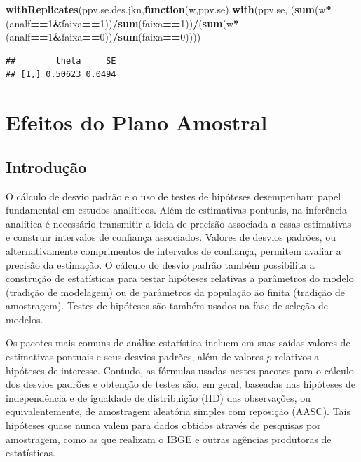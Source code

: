 \documentclass[]{book}
\newenvironment{Shaded}{\begin{snugshade}}{\end{snugshade}}
\newcommand{\KeywordTok}[1]{\textcolor[rgb]{0.13,0.29,0.53}{\textbf{#1}}}
\newcommand{\DecValTok}[1]{\textcolor[rgb]{0.00,0.00,0.81}{#1}}
\newcommand{\ControlFlowTok}[1]{\textcolor[rgb]{0.13,0.29,0.53}{\textbf{#1}}}
\newcommand{\OperatorTok}[1]{\textcolor[rgb]{0.81,0.36,0.00}{\textbf{#1}}}
\newcommand{\NormalTok}[1]{#1}
\theoremstyle{definition}
\theoremstyle{definition}
\theoremstyle{definition}
\theoremstyle{remark}
\begin{document}
\begin{Shaded}
\begin{Highlighting}[]
\KeywordTok{withReplicates}\NormalTok{(ppv.se.des.jkn,}\ControlFlowTok{function}\NormalTok{(w,ppv.se) }\KeywordTok{with}\NormalTok{(ppv.se,}
\NormalTok{(}\KeywordTok{sum}\NormalTok{(w}\OperatorTok{*}\NormalTok{(analf}\OperatorTok{==}\DecValTok{1}\OperatorTok{&}\NormalTok{faixa}\OperatorTok{==}\DecValTok{1}\NormalTok{))}\OperatorTok{/}\KeywordTok{sum}\NormalTok{(faixa}\OperatorTok{==}\DecValTok{1}\NormalTok{))}\OperatorTok{/}\NormalTok{(}\KeywordTok{sum}\NormalTok{(w}\OperatorTok{*}\NormalTok{(analf}\OperatorTok{==}\DecValTok{1}\OperatorTok{&}\NormalTok{faixa}\OperatorTok{==}\DecValTok{0}\NormalTok{))}\OperatorTok{/}\KeywordTok{sum}\NormalTok{(faixa}\OperatorTok{==}\DecValTok{0}\NormalTok{))))}
\end{Highlighting}
\end{Shaded}

\begin{verbatim}
##        theta     SE
## [1,] 0.50623 0.0494
\end{verbatim}

\chapter{Efeitos do Plano Amostral}\label{epa}

\section{Introdução}\label{introducao}

O cálculo de desvio padrão e o uso de testes de hipóteses desempenham
papel fundamental em estudos analíticos. Além de estimativas pontuais,
na inferência analítica é necessário transmitir a ideia de precisão
associada a essas estimativas e construir intervalos de confiança
associados. Valores de desvios padrões, ou alternativamente comprimentos
de intervalos de confiança, permitem avaliar a precisão da estimação. O
cálculo do desvio padrão também possibilita a construção de estatísticas
para testar hipóteses relativas a parâmetros do modelo (tradição de
modelagem) ou de parâmetros da população ão finita (tradição de
amostragem). Testes de hipóteses são também usados na fase de seleção de
modelos.

Os pacotes mais comuns de análise estatística incluem em suas saídas
valores de estimativas pontuais e seus desvios padrões, além de
valores-\(p\) relativos a hipóteses de interesse. Contudo, as fórmulas
usadas nestes pacotes para o cálculo dos desvios padrões e obtenção de
testes são, em geral, baseadas nas hipóteses de independência e de
igualdade de distribuição (IID) das observações, ou equivalentemente, de
amostragem aleatória simples com reposição (AASC). Tais hipóteses quase
nunca valem para dados obtidos através de pesquisas por amostragem, como
as que realizam o IBGE e outras agências produtoras de estatísticas.
\end{document}

